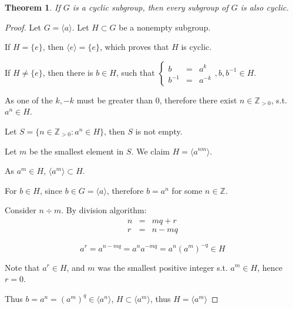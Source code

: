 \documentclass{article}
\theoremstyle{MyNonumberplain}
\theoremstyle{break}
\newtheorem*{proof}{Proof. }
\newcommand{\cyclic}[1]{\langle #1 \rangle}
\theoremstyle{break}
\newtheorem{theorem}{Theorem}[section]
\theoremstyle{break}
\theoremstyle{definition}
\theoremstyle{break}
\begin{document}
\begin{thmbox}
    \begin{theorem}
        If $G$ is a cyclic subgroup, then every subgroup of $G$ is also cyclic.
    \end{theorem}
    \begin{prfbox}
        \begin{proof}
            Let $G=\cyclic{a}$. Let $H\subset G$ be a nonempty subgroup.\bigskip

            If $H=\{e\}$, then $\cyclic{e}=\{e\}$, which proves that $H$ is cyclic.\bigskip

            If $H\neq\{e\}$, then there is $b\in H$, such that 
            $\left\{\begin{array}{lll}
                b & = & a^k\\
                b^{- 1} & = & a^{- k}
              \end{array}\right., b, b^{- 1} \in H$.\bigskip
    
              As one of the $k, - k$ must be greater than 0, therefore there
              exist $n \in \mathbb{Z}_{> 0}$, s.t. $a^n \in H$.\bigskip
              
              Let $S = \{ n \in \mathbb{Z}_{> 0} : a^n \in H \}$, then $S$ is not empty.\bigskip
              
              Let $m$ be the smallest element in $S$. We claim $H = \cyclic{a^{nm}}.$\bigskip
              
              As $a^m \in H$, $\cyclic{a^m} \subset H$.\bigskip
              
              For $b \in H$, since $b \in G = \cyclic{a}$, therefore $b = a^n$ for some $n \in \mathbb{Z}.$\bigskip
              
              Consider $n \div m$. By division algorithm:\bigskip
              \begin{eqnarray*}
                n & = & m q + r\\
                r & = & n - m q
              \end{eqnarray*}

              \[ a^r = a^{n - m q} = a^n a^{- m q} = a^n (a^m)^{- q} \in H \]\bigskip

              Note that $a^r \in H$, and $m$ was the smallest positive integer s.t. $a^m \in
              H$, hence $r = 0$.\bigskip
              
              Thus $b = a^n = (a^m)^q \in \cyclic{a^n}$, $H \subset \cyclic{a^m}$, thus $H = \cyclic{a^m}$
        \end{proof}
    \end{prfbox}
    
\end{thmbox}
\end{document}
